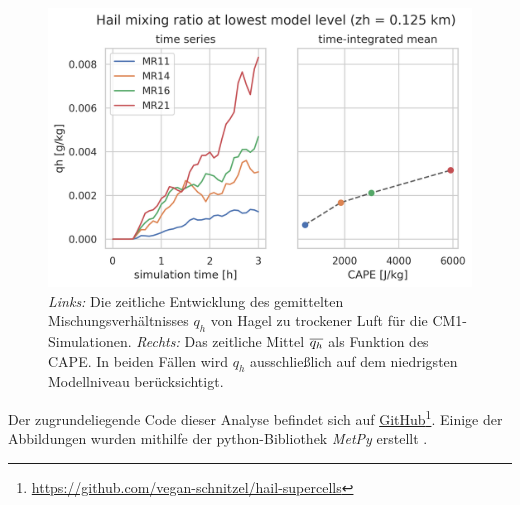 \begin{figure}
	\centering
	\includegraphics[width=0.9\linewidth]{../figs/hail.png}
	\caption{\textit{Links:} Die zeitliche Entwicklung des gemittelten Mischungsverhältnisses \(q_h\) von Hagel zu trockener Luft für die CM1-Simulationen. \textit{Rechts:} Das zeitliche Mittel \(\overline{q_h}\) als Funktion des CAPE. In beiden Fällen wird \(q_h\) ausschließlich auf dem niedrigsten Modellniveau berücksichtigt.}
	\label{fig:hail}
\end{figure}

Der zugrundeliegende Code dieser Analyse befindet sich auf \href{https://github.com/vegan-schnitzel/hail-supercells}{GitHub}\footnote{\hypersetup{urlcolor=}\url{https://github.com/vegan-schnitzel/hail-supercells}}. Einige der Abbildungen wurden mithilfe der python-Bibliothek \textit{MetPy} erstellt \parencite{may2016}.